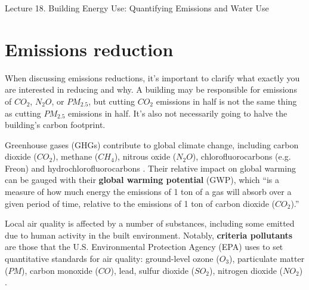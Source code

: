 \documentclass[10pt]{article}
\begin{document}
   \noindent
   \begin{center}

   \hrulefill
   
   \vspace{5pt}
   
   \vspace{0pt}
   
   {\Large \hfill  Lecture 18. Building Energy Use: Quantifying Emissions and Water Use}
   \vspace{5pt}
   
 {}
  
   \hrulefill
   \end{center}



\section{Emissions reduction}

When discussing emissions reductions, it's important to clarify what exactly you are interested in reducing and why. A building may be responsible for emissions of $CO_2$, $N_2O$, or $PM_{2.5}$, but cutting $CO_2$ emissions in half is not the same thing as cutting $PM_{2.5}$ emissions in half. It's also not necessarily going to halve the building's carbon footprint.

Greenhouse gases (GHGs) contribute to global climate change, including carbon dioxide ($CO_2$), methane ($CH_4$), nitrous oxide ($N_2O$), chlorofluorocarbons (e.g. Freon) and hydrochlorofluorocarbons \cite{Epa2014-mz}. Their relative impact on global warming can be gauged with their \textbf{global warming potential} (GWP), which ``is a measure of how much energy the emissions of 1 ton of a gas will absorb over a given period of time, relative to the emissions of 1 ton of carbon dioxide ($CO_2$).'' \cite{Epa2017-ur}

Local air quality is affected by a number of substances, including some emitted due to human activity in the built environment. Notably, \textbf{criteria pollutants} are those that the U.S. Environmental Protection Agency (EPA) uses to set quantitative standards for air quality: ground-level ozone ($O_3$), particulate matter ($PM$), carbon monoxide ($CO$), lead, sulfur dioxide ($SO_2$), nitrogen dioxide ($NO_2$) \cite{Epa2014-xv}.
\end{document}
